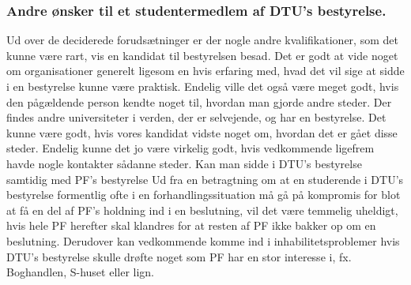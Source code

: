 \subsubsection{Andre ønsker til et studentermedlem af DTU’s bestyrelse.} 
Ud over de deciderede forudsætninger er der nogle andre kvalifikationer, som det kunne være rart, vis en kandidat til bestyrelsen besad. Det er godt at vide noget om organisationer generelt ligesom en hvis erfaring med, hvad det vil sige
at sidde i en bestyrelse kunne være praktisk.
Endelig ville det også være meget godt, hvis den pågældende person kendte noget til, hvordan man gjorde andre steder.
Der findes andre universiteter i verden, der er selvejende, og har en bestyrelse. Det kunne være godt, hvis vores
kandidat vidste noget om, hvordan det er gået disse steder. Endelig kunne det jo være virkelig godt, hvis vedkommende
ligefrem havde nogle kontakter sådanne steder.
Kan man sidde i DTU’s bestyrelse samtidig med PF’s bestyrelse
Ud fra en betragtning om at en studerende i DTU’s bestyrelse formentlig ofte i en forhandlingssituation må gå på
kompromis for blot at få en del af PF’s holdning ind i en beslutning, vil det være temmelig uheldigt, hvis hele PF
herefter skal klandres for at resten af PF ikke bakker op om en beslutning. Derudover kan vedkommende komme ind i
inhabilitetsproblemer hvis DTU’s bestyrelse skulle drøfte noget som PF har en stor interesse i, fx. Boghandlen, S-huset
eller lign.
\\
\\

